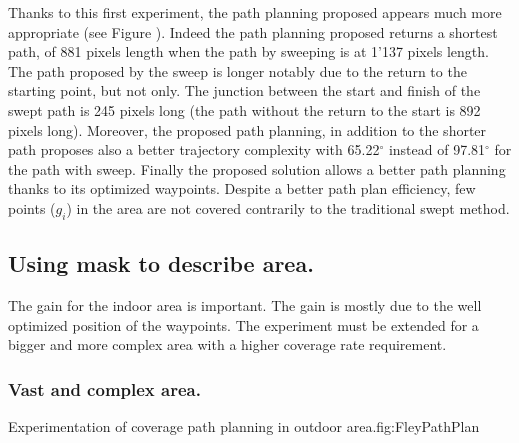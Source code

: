 Thanks to this first experiment, the path planning proposed appears much more appropriate (see Figure ). Indeed the path planning proposed returns a shortest path, of 881 pixels length when  the path by sweeping is at 1'137 pixels length. The path proposed by the sweep is longer notably due to the return to the starting point, but not only. The junction between the start and finish of the swept path is 245 pixels long (the path without the return to the start is 892  pixels long).%
 Moreover, the proposed path planning, in addition to the shorter path proposes also a better trajectory complexity  with 65.22$^\circ$ instead of 97.81$^\circ$ for the path with sweep.
Finally the proposed solution allows a better path planning thanks to its optimized waypoints. Despite a better path plan efficiency, few points ($g_i$) in the area are not covered contrarily to the traditional swept method.



\subsection{Using mask to describe area.}\label{coverageOutDoor}

The gain for the indoor area is important. The gain is mostly due to the well optimized position of the waypoints. The experiment must be extended for a bigger and more complex area with a higher coverage rate requirement.


\subsubsection{Vast and complex area.} \label{fey_map_CPPP}
 
 \begin{mfigures}[!]{Experimentation of coverage path planning in outdoor area.}{fig:FleyPathPlan} \centering
\hspace{1cm}

\tabsimuposeFleyPath
\end{mfigures} 
 
